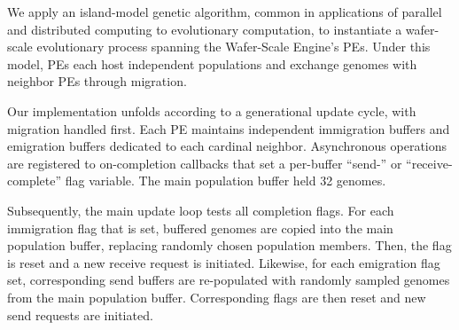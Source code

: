 

% 

We apply an island-model genetic algorithm, common in applications of parallel and distributed computing to evolutionary computation, to instantiate a wafer-scale evolutionary process spanning the Wafer-Scale Engine's PEs.
Under this model, PEs each host independent populations and exchange genomes with neighbor PEs through migration.

Our implementation unfolds according to a generational update cycle, with migration handled first.
Each PE maintains independent immigration buffers and emigration buffers dedicated to each cardinal neighbor.
Asynchronous operations are registered to on-completion callbacks that set a per-buffer ``send-'' or ``receive-complete'' flag variable.
The main population buffer held 32 genomes.

Subsequently, the main update loop tests all completion flags.
For each immigration flag that is set, buffered genomes are copied into the main population buffer, replacing randomly chosen population members.
Then, the flag is reset and a new receive request is initiated.
Likewise, for each emigration flag set, corresponding send buffers are re-populated with randomly sampled genomes from the main population buffer.
Corresponding flags are then reset and new send requests are initiated.

